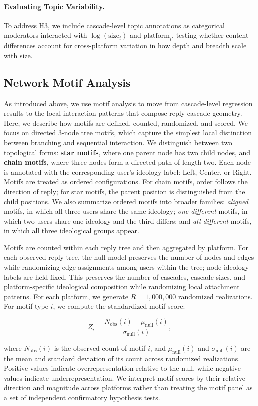 \documentclass[letterpaper]{article} %
\begin{document}
\paragraph*{Evaluating Topic Variability.}
To address H3, we include cascade-level topic annotations as categorical moderators interacted with $\log(\text{size}_i)$ and $\text{platform}_i$, testing whether content differences account for cross-platform variation in how depth and breadth scale with size.

\subsection{Network Motif Analysis}
As introduced above, we use motif analysis to move from cascade-level regression results to the local interaction patterns that compose reply cascade geometry. Here, we describe how motifs are defined, counted, randomized, and scored. We focus on directed 3-node tree motifs, which capture the simplest local distinction between branching and sequential interaction. We distinguish between two topological forms: \textbf{star motifs}, where one parent node has two child nodes, and \textbf{chain motifs}, where three nodes form a directed path of length two. Each node is annotated with the corresponding user's ideology label: Left, Center, or Right. Motifs are treated as ordered configurations. For chain motifs, order follows the direction of reply; for star motifs, the parent position is distinguished from the child positions. We also summarize ordered motifs into broader families: \textit{aligned} motifs, in which all three users share the same ideology; \textit{one-different} motifs, in which two users share one ideology and the third differs; and \textit{all-different} motifs, in which all three ideological groups appear.

Motifs are counted within each reply tree and then aggregated by platform. For each observed reply tree, the null model preserves the number of nodes and edges while randomizing edge assignments among users within the tree; node ideology labels are held fixed. This preserves the number of cascades, cascade sizes, and platform-specific ideological composition while randomizing local attachment patterns. For each platform, we generate $R=1{,}000{,}000$ randomized realizations. For motif type $i$, we compute the standardized motif score:

\[
Z_i = \frac{N_{\mathrm{obs}}(i) - \mu_{\mathrm{null}}(i)}{\sigma_{\mathrm{null}}(i)} ,
\]

where $N_{\mathrm{obs}}(i)$ is the observed count of motif $i$, and $\mu_{\mathrm{null}}(i)$ and $\sigma_{\mathrm{null}}(i)$ are the mean and standard deviation of its count across randomized realizations. Positive values indicate overrepresentation relative to the null, while negative values indicate underrepresentation. We interpret motif scores by their relative direction and magnitude across platforms rather than treating the motif panel as a set of independent confirmatory hypothesis tests.
\end{document}
